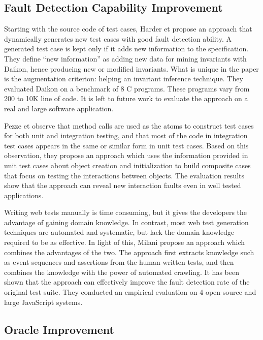 \subsection{Fault Detection Capability Improvement}
\label{subsec:sota:category-1:fault-detection}

Starting with the source code of test cases, Harder et \etal\cite{Harder03} propose an approach that dynamically generates new test cases with good fault detection ability.
A generated test case is kept only if it adds new information to the specification.
They define ``new information'' as adding new data for mining invariants with Daikon, hence producing new or modified invariants. 
What is unique in the paper is the augmentation criterion: helping an invariant inference technique.
They evaluated Daikon on a benchmark of 8 C programs. 
These programs vary from 200 to 10K line of code. 
It is left to future work to evaluate the approach on a real and large software application.

Pezze et \etal\cite{pezze2013} observe that method calls are used as the atoms to construct test cases for both unit and integration testing, and that most of the code in integration test cases
appears in the same or similar form in unit test cases. 
Based on this observation, they propose an approach which uses the information provided in unit test cases about object creation and initialization to build composite cases that focus on testing the interactions between objects. 
The evaluation results show that the approach can reveal new interaction faults even in well tested applications. 

Writing web tests manually is time consuming, but it gives the developers the advantage of gaining domain knowledge. 
In contrast, most web test generation techniques are automated and systematic, but lack the domain knowledge required to be as effective. 
In light of this, Milani \etal\cite{milani2014} propose an approach which combines the advantages of the two. 
The approach first extracts knowledge such as event sequences and assertions from the human-written tests, and then combines the knowledge with the power of automated crawling. 
It has been shown that the approach can effectively improve the fault detection rate of the original test suite.
They conducted an empirical evaluation on 4 open-source and large JavaScript systems. 

\subsection{Oracle Improvement}
\label{subsec:sota:category-1:oracle-improvement}

